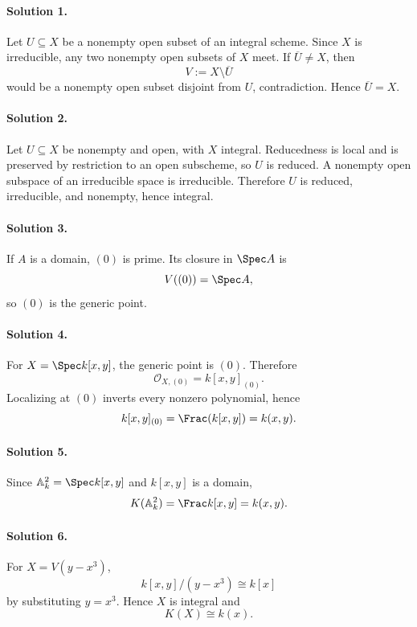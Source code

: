 
\paragraph{Solution 1.}
Let \(U\subseteq X\) be a nonempty open subset of an integral scheme. Since \(X\) is irreducible,
any two nonempty open subsets of \(X\) meet. If \(\overline U\ne X\), then
\[
V:=X\setminus\overline U
\]
would be a nonempty open subset disjoint from \(U\), contradiction. Hence \(\overline U=X\).

\paragraph{Solution 2.}
Let \(U\subseteq X\) be nonempty and open, with \(X\) integral. Reducedness is local and is preserved
by restriction to an open subscheme, so \(U\) is reduced. A nonempty open subspace of an
irreducible space is irreducible. Therefore \(U\) is reduced, irreducible, and nonempty, hence
integral.

\paragraph{Solution 3.}
If \(A\) is a domain, \((0)\) is prime. Its closure in \(\Spec A\) is
\[
V((0))=\Spec A,
\]
so \((0)\) is the generic point.

\paragraph{Solution 4.}
For \(X=\Spec k[x,y]\), the generic point is \((0)\). Therefore
\[
\mathcal O_{X,(0)}=k[x,y]_{(0)}.
\]
Localizing at \((0)\) inverts every nonzero polynomial, hence
\[
k[x,y]_{(0)}=\Frac(k[x,y])=k(x,y).
\]

\paragraph{Solution 5.}
Since \(\mathbb A^2_k=\Spec k[x,y]\) and \(k[x,y]\) is a domain,
\[
K(\mathbb A^2_k)=\Frac k[x,y]=k(x,y).
\]

\paragraph{Solution 6.}
For \(X=V(y-x^3)\),
\[
k[x,y]/(y-x^3)\cong k[x]
\]
by substituting \(y=x^3\). Hence \(X\) is integral and
\[
K(X)\cong k(x).
\]

